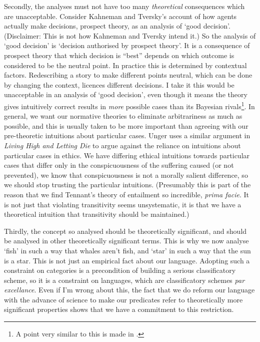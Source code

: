 Secondly, the analyses must not have too many \textit{theoretical }consequences which are unacceptable. Consider Kahneman and Tversky's account of how agents actually make decisions, prospect theory, as an analysis of `good decision'. (Disclaimer: This is not how Kahneman and Tversky intend it.) So the analysis of `good decision' is `decision authorised by prospect theory'. It is a consequence of prospect theory that which decision is ``best'' depends on which outcome is considered to be the neutral point. In practice this is determined by contextual factors. Redescribing a story to make different points neutral, which can be done by changing the context, licences different decisions. I take it this would be unacceptable in an analysis of `good decision', even though it means the theory gives intuitively correct results in \textit{more} possible cases than its Bayesian rivals\footnote{A point very similar to this is made in \citet{Horowitz1998}.}. In general, we want our normative theories to eliminate arbitrariness as much as possible, and this is usually taken to be more important than agreeing with our pre-theoretic intuitions about particular cases. Unger uses a similar argument in \textit{Living High and Letting Die} to argue against the reliance on intuitions about particular cases in ethics. We have differing ethical intuitions towards particular cases that differ only in the conspicuousness of the suffering caused (or not prevented), we know that conspicuousness is not a morally salient difference, so we should stop trusting the particular intuitions. (Presumably this is part of the reason that we find Tennant's theory of entailment so incredible, \textit{prima facie}. It is not just that violating transitivity seems unsystematic, it is that we have a theoretical intuition that transitivity should be maintained.) 

Thirdly, the concept so analysed should be theoretically significant, and should be analysed in other theoretically significant terms. This is why we now analyse `fish' in such a way that whales aren't fish, and `star' in such a way that the sun is a star. This is not just an empirical fact about our language. Adopting such a constraint on categories is a precondition of building a serious classificatory scheme, so it is a constraint on languages, which are classificatory schemes \textit{par excellance}. Even if I'm wrong about this, the fact that we do reform our language with the advance of science to make our predicates refer to theoretically more significant properties shows that we have a commitment to this restriction.

